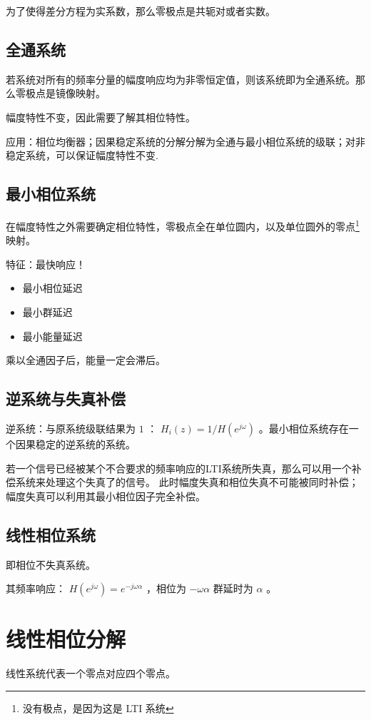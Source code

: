 \documentclass[cn,11pt,chinese,black,simple]{../elegantbook}
\begin{document}
为了使得差分方程为实系数，那么零极点是共轭对或者实数。

\subsection{全通系统}

若系统对所有的频率分量的幅度响应均为非零恒定值，则该系统即为全通系统。那么零极点是镜像映射。

幅度特性不变，因此需要了解其相位特性。

应用：相位均衡器；因果稳定系统的分解分解为全通与最小相位系统的级联；对非稳定系统，可以保证幅度特性不变.

\subsection{最小相位系统}

在幅度特性之外需要确定相位特性，零极点全在单位圆内，以及单位圆外的零点\footnote{没有极点，是因为这是 LTI 系统}映射。

特征：最快响应！
\begin{itemize}
    \item 最小相位延迟
    \item 最小群延迟
    \item 最小能量延迟
\end{itemize}

乘以全通因子后，能量一定会滞后。

\subsection{逆系统与失真补偿}

逆系统：与原系统级联结果为 \(1\) ： \(H_i(z) = 1 / H(e^{j\omega})\) 。最小相位系统存在一个因果稳定的逆系统的系统。

若一个信号已经被某个不合要求的频率响应的LTI系统所失真，那么可以用一个补偿系统来处理这个失真了的信号。
此时幅度失真和相位失真不可能被同时补偿；幅度失真可以利用其最小相位因子完全补偿。

\subsection{线性相位系统}

即相位不失真系统。

其频率响应： \(H(e^{j\omega}) = e^{-j\omega \alpha}\) ，相位为 \(-\omega \alpha\) 群延时为 \(\alpha\) 。


\section{线性相位分解}

线性系统代表一个零点对应四个零点。


\let\chapname\undefined
\ifx\mainclass\undefined
\end{document}
